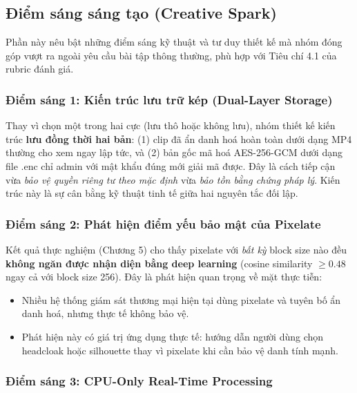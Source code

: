 \subsection{Điểm sáng sáng tạo (Creative Spark)}
\label{subsec:creativespark}

Phần này nêu bật những điểm sáng kỹ thuật và tư duy thiết kế mà nhóm đóng góp vượt ra ngoài yêu cầu bài tập thông thường, phù hợp với Tiêu chí 4.1 của rubric đánh giá.

\subsubsection{Điểm sáng 1: Kiến trúc lưu trữ kép (Dual-Layer Storage)}

Thay vì chọn một trong hai cực (lưu thô hoặc không lưu), nhóm thiết kế kiến trúc \textbf{lưu đồng thời hai bản}: (1) clip đã ẩn danh hoá hoàn toàn dưới dạng MP4 thường cho xem ngay lập tức, và (2) bản gốc mã hoá AES-256-GCM dưới dạng file .enc chỉ admin với mật khẩu đúng mới giải mã được. Đây là cách tiếp cận vừa \textit{bảo vệ quyền riêng tư theo mặc định} vừa \textit{bảo tồn bằng chứng pháp lý}. Kiến trúc này là sự cân bằng kỹ thuật tinh tế giữa hai nguyên tắc đối lập.

\subsubsection{Điểm sáng 2: Phát hiện điểm yếu bảo mật của Pixelate}

Kết quả thực nghiệm (Chương 5) cho thấy pixelate với \textit{bất kỳ} block size nào đều \textbf{không ngăn được nhận diện bằng deep learning} (cosine similarity $\geq 0.48$ ngay cả với block size 256). Đây là phát hiện quan trọng về mặt thực tiễn:
\begin{itemize}
    \item Nhiều hệ thống giám sát thương mại hiện tại dùng pixelate và tuyên bố ẩn danh hoá, nhưng thực tế không bảo vệ.
    \item Phát hiện này có giá trị ứng dụng thực tế: hướng dẫn người dùng chọn headcloak hoặc silhouette thay vì pixelate khi cần bảo vệ danh tính mạnh.
\end{itemize}

\subsubsection{Điểm sáng 3: CPU-Only Real-Time Processing}

